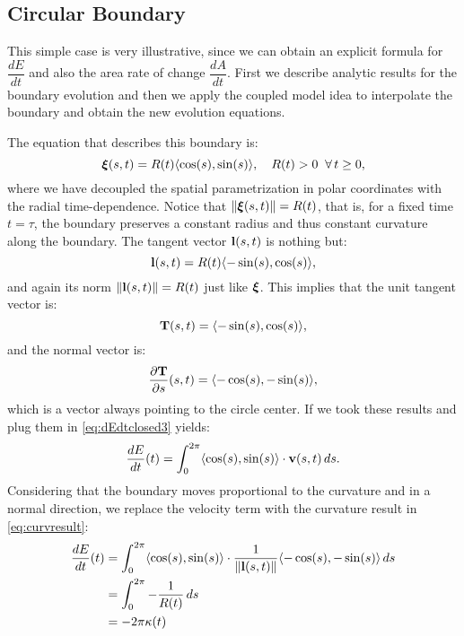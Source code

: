 
\subsection{Circular Boundary}
\label{sec:circularboundary}

This simple case is very illustrative, since we can obtain an explicit formula for $\dfrac{dE}{dt}$ and also the area rate of change $\dfrac{dA}{dt}$. 
First we describe analytic results for the boundary evolution and then we apply the coupled model idea to interpolate the boundary and obtain the new evolution equations.

The equation that describes this boundary is:
\begin{equation}
    \bm{\xi}(s,t) = R(t)\langle \cos(s), \sin(s) \rangle,\quad R(t) > 0 \;\;\forall\,t \geq 0,
    \label{eq:circle}
\end{equation}
where we have decoupled the spatial parametrization in polar coordinates with the radial time-dependence. Notice that $\left\lVert\bm{\xi}(s,t)\right\rVert = R(t)$, that is, for a fixed time $t=\tau$, the boundary preserves a constant radius and thus constant curvature along the boundary. The tangent vector $\mathbf{l}(s,t)$ is nothing but:
\begin{equation*}
    \mathbf{l}(s,t) = R(t)\langle -\sin(s), \cos(s) \rangle,
\end{equation*}
and again its norm $\left\lVert\mathbf{l}(s,t)\right\rVert = R(t)$ just like $\bm{\xi}$. This implies that the unit tangent vector is:
\begin{equation*}
\mathbf{T}(s,t) = \langle -\sin(s), \cos(s) \rangle,
\end{equation*}
and the normal vector is:
\begin{equation*}
    \dfrac{\partial \mathbf{T}}{\partial s}(s,t) = \langle -\cos(s), -\sin(s) \rangle,
\end{equation*}
which is a vector always pointing to the circle center. If we took these results and plug them in \eqref{eq:dEdtclosed3} yields:
\begin{equation*}
    \dfrac{dE}{dt}(t) = \int_0^{2\pi}  \langle \cos(s), \sin(s) \rangle \cdot \mathbf{v}(s,t)\, ds.
\end{equation*}
Considering that the boundary moves proportional to the curvature and in a normal direction, we replace the velocity term with the curvature result in \eqref{eq:curvresult}:
\begin{align}
    \dfrac{dE}{dt}(t) &= \int_0^{2\pi}  \langle \cos(s), \sin(s) \rangle \cdot \frac{1}{\left\lVert\mathbf{l}(s,t)\right\rVert} \langle -\cos(s), -\sin(s) \rangle\, ds \nonumber\\
    &= \int_0^{2\pi} -\frac{1}{R(t)} \,ds \nonumber\\
    &= -2\pi \kappa(t) \label{eq:dEdtcircle}
\end{align}

